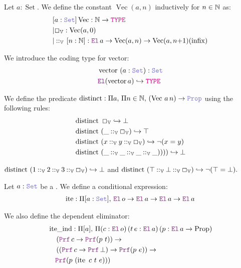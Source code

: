 \begin{definition}
Let \( a : \mathop{\mathrm{Set}} \). We define the constant \( \mathop{\mathrm{Vec}}(a, n) \) inductively for \( n \in \mathbb{N} \) as:
\begin{align*}
&[a: \set] \mathop{\mathrm{Vec}}: \N \ra \type \\
&|\Box_\bb{V} : \mathop{\mathrm{Vec}}(a, 0) \\
&|\mathbin{::}_\bb{V}\,[n:\N]: \el\,a \ra \mathop{\mathrm{Vec}}(a, n) \ra  \mathop{\mathrm{Vec}}(a, n{+}1) (\text{infix}) \\
\end{align*}

We introduce the coding type for vector:
\begin{align*}
&\mathop{\mathrm{vector}}~(a: \set): \set \\
&\el (\mathop{\mathrm{vector}} a) \re \type
\end{align*}

We define the predicate \( \mathop{\mathrm{distinct}}: \Pi a,\, \Pi n \in \N,\, (\mathop{\mathrm{Vec}}\,a\,n) \ra \prop \) using the following rules:
\begin{align*}
&\mathop{\mathrm{distinct}}~\Box_\mathbb{V} \hookrightarrow \bot \\
&\mathop{\mathrm{distinct}}~(\_ \mathbin{::}_\mathbb{V} \Box_\mathbb{V}) \hookrightarrow \top \\
&\mathop{\mathrm{distinct}}~(x \mathbin{::}_\mathbb{V} y \mathbin{::}_\mathbb{V}  \Box_\mathbb{V}) \hookrightarrow \neg (x = y) \\
&\mathop{\mathrm{distinct}}~(\_ \mathbin{::}_\mathbb{V} \_ \mathbin{::}_\mathbb{V} \_ \mathbin{::}_\mathbb{V} \_)))) \hookrightarrow \bot
\end{align*}
\end{definition}

\begin{example}
\(
    \mathop{\mathrm{distinct}}~(1 \mathbin{::}_\mathbb{V} 2 \mathbin{::}_\mathbb{V} 3 \mathbin{::}_\mathbb{V} \Box_\mathbb{V}) \hookrightarrow \bot
\)
and
\(
    \mathop{\mathrm{distinct}}~(\top \mathbin{::}_\mathbb{V} \bot \mathbin{::}_\mathbb{V} \Box_\mathbb{V}) \hookrightarrow \neg (\top = \bot).
\)
\end{example}

\begin{definition}
Let \( a: \set \) be a \set. We define a conditional expression:
\begin{align*}
\mathop{\mathrm{ite}} : \Pi [a: \set],\, \el\,o \ra \el\,a \ra \el\,a \ra \el\,a
\end{align*}

We also define the dependent eliminator:
\begin{align*}
&\mathop{\mathrm{ite\_ind}} : \Pi [a],\, \Pi (c : \el\,o)\, (t\, e : \el\,a)\, (p : \el\,a \ra \mathrm{Prop})\\
&\quad\left( \prf\,c \ra \prf(p~t) \right) \ra \\
&\quad\left( (\prf\,c \ra \prf\,\bot) \ra \prf(p~e) \right) \ra \\
&\quad\prf(p~(\mathop{\mathrm{ite}}~c~t~e)))
\end{align*}
\end{definition}
